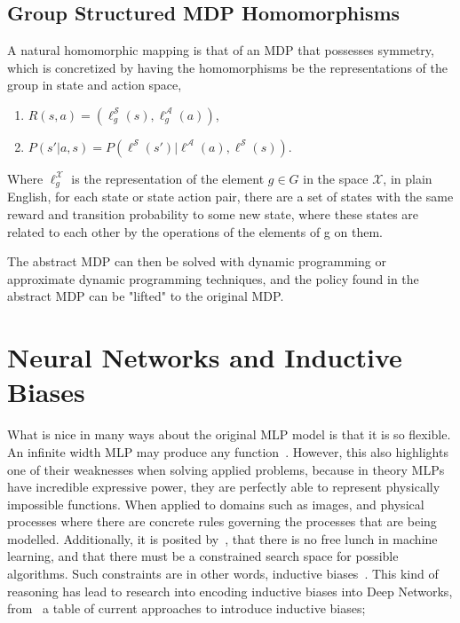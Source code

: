 \subsection{Group Structured MDP Homomorphisms}
A natural homomorphic mapping is that of an MDP that possesses symmetry, which is concretized by having the homomorphisms be the representations of the group in state and action space,
\begin{enumerate}
	\item $R(s, a) = (\ell^\mathcal{S}_g(s), \ell^\mathcal{A}_g(a))$,
	\item $P(s'| a, s) =P(\ell^\mathcal{S}(s')| \ell^\mathcal{A}(a), \ell^\mathcal{S}(s))$.
\end{enumerate}
Where $\ell_g^\mathcal{X}$ is the representation of the element $g \in G$ in the space $\mathcal{X}$, in plain English, for each state or state action pair, there are a set of states with the same reward and transition probability to some new state, where these states are related to each other by the operations of the elements of g on them.



The abstract MDP can then be solved with dynamic programming or approximate dynamic programming techniques\cite{van2020plannable, rezaei2022continuous}, and the policy found in the abstract MDP can be "lifted" to the original MDP.

\section{Neural Networks and Inductive Biases}

What is nice in many ways about the original MLP model is that it is so flexible. An infinite width MLP may produce any function~\cite{hornik1991approximation}. However, this also highlights one of their weaknesses when solving applied problems, because in theory MLPs have incredible expressive power, they are perfectly able to represent physically impossible functions. When applied to domains such as images, and physical processes where there are concrete rules governing the processes that are being modelled. Additionally, it is posited by~\cite{wolpert1995no}, that there is no free lunch in machine learning, and that there must be a constrained search space for possible algorithms. Such constraints are in other words, inductive biases~\cite{baxter2000model}. This kind of reasoning has lead to research into encoding inductive biases into Deep Networks, from~\cite{goyal2022inductive} a table of current approaches to introduce inductive biases;

